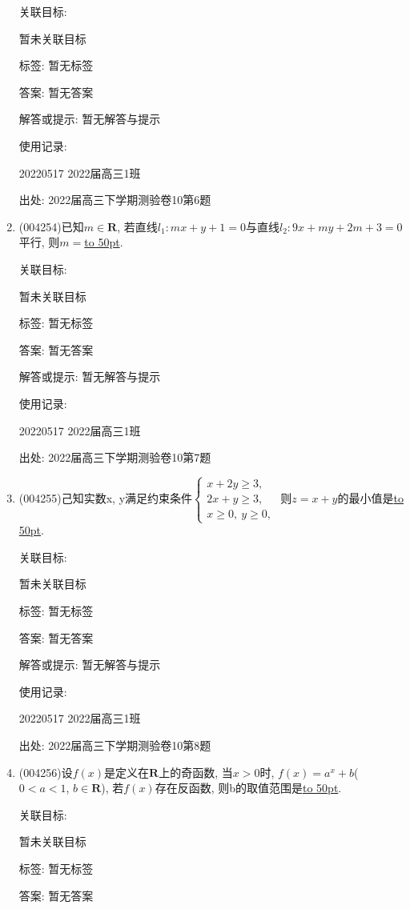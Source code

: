 \documentclass[10pt,a4paper]{article}
\newcommand{\blank}[1]{\underline{\hbox to #1pt{}}}
\begin{document}
\begin{enumerate}[1.]
关联目标:

暂未关联目标



标签: 暂无标签

答案: 暂无答案

解答或提示: 暂无解答与提示

使用记录:

20220517	2022届高三1班	


出处: 2022届高三下学期测验卷10第6题
\item { (004254)}已知$m\in \mathbf{R}$, 若直线$l_1:mx+y+1=0$与直线$l_2:9x+my+2m+3=0$平行, 则$m=$\blank{50}.


关联目标:

暂未关联目标



标签: 暂无标签

答案: 暂无答案

解答或提示: 暂无解答与提示

使用记录:

20220517	2022届高三1班	


出处: 2022届高三下学期测验卷10第7题
\item { (004255)}己知实数x, y满足约束条件$\begin{cases} x+2y\ge 3, \\ 2x+y\ge 3, \\ x\ge 0, \ y\ge 0, \end{cases}$ 则$z=x+y$的最小值是\blank{50}.


关联目标:

暂未关联目标



标签: 暂无标签

答案: 暂无答案

解答或提示: 暂无解答与提示

使用记录:

20220517	2022届高三1班	


出处: 2022届高三下学期测验卷10第8题
\item { (004256)}设$f(x)$是定义在$\mathbf{R}$上的奇函数, 当$x>0$时, $f(x)=a^x+b$($0<a<1$, $b\in \mathbf{R}$), 若$f(x)$存在反函数, 则b的取值范围是\blank{50}.


关联目标:

暂未关联目标



标签: 暂无标签

答案: 暂无答案


\end{enumerate}
\end{document}
